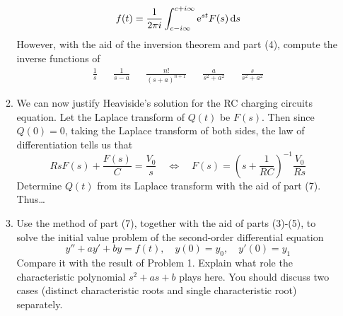\documentclass[../psets.tex]{subfiles}
\begin{document}
\begin{enumerate}
\begin{enumerate}
\begin{equation*}
            f(t) = \frac{1}{2\pi i}\int_{c-i\infty}^{c+i\infty}\e[st]F(s)\dd{s}
        \end{equation*}
        However, with the aid of the inversion theorem and part (4), compute the inverse functions of
        \begin{align*}
            \frac{1}{s}&&
            \frac{1}{s-a}&&
            \frac{n!}{(s+a)^{n+1}}&&
            \frac{a}{s^2+a^2}&&
            \frac{s}{s^2+a^2}
        \end{align*}
        \item We can now justify Heaviside's solution for the RC charging circuits equation. Let the Laplace transform of $Q(t)$ be $F(s)$. Then since $Q(0)=0$, taking the Laplace transform of both sides, the law of differentiation tells us that
        \begin{equation*}
            RsF(s)+\frac{F(s)}{C} = \frac{V_0}{s}
            \quad\Longleftrightarrow\quad
            F(s) = \left( s+\frac{1}{RC} \right)^{-1}\frac{V_0}{Rs}
        \end{equation*}
        Determine $Q(t)$ from its Laplace transform with the aid of part (7). Thus\dots
        \item Use the method of part (7), together with the aid of parts (3)-(5), to solve the initial value problem of the second-order differential equation
        \begin{equation*}
            y''+ay'+by = f(t)
            ,\quad
            y(0) = y_0
            ,\quad
            y'(0) = y_1
        \end{equation*}
        Compare it with the result of Problem 1. Explain what role the characteristic polynomial $s^2+as+b$ plays here. You should discuss two cases (distinct characteristic roots and single characteristic root) separately.
    \end{enumerate}
\end{enumerate}
\end{document}

